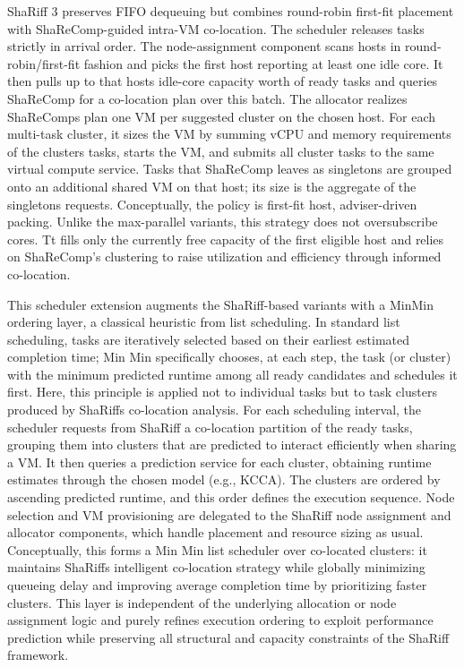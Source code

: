 ShaRiff 3 preserves FIFO dequeuing but combines round-robin first-fit placement with ShaReComp-guided intra-VM co-location. The scheduler releases tasks strictly in arrival order. The node-assignment component scans hosts in round-robin/first-fit fashion and picks the first host reporting at least one idle core. It then pulls up to that hosts idle-core capacity worth of ready tasks and queries ShaReComp for a co-location plan over this batch.
The allocator realizes ShaReComps plan one VM per suggested cluster on the chosen host. For each multi-task cluster, it sizes the VM by summing vCPU and memory requirements of the clusters tasks, starts the VM, and submits all cluster tasks to the same virtual compute service. Tasks that ShaReComp leaves as singletons are grouped onto an additional shared VM on that host; its size is the aggregate of the singletons requests.
Conceptually, the policy is first-fit host, adviser-driven packing. Unlike the max-parallel variants, this strategy does not oversubscribe cores. Tt fills only the currently free capacity of the first eligible host and relies on ShaReComp's clustering to raise utilization and efficiency through informed co-location.

This scheduler extension augments the ShaRiff-based variants with a MinMin ordering layer, a classical heuristic from list scheduling. In standard list scheduling, tasks are iteratively selected based on their earliest estimated completion time; Min Min specifically chooses, at each step, the task (or cluster) with the minimum predicted runtime among all ready candidates and schedules it first. Here, this principle is applied not to individual tasks but to task clusters produced by ShaRiffs co-location analysis.
For each scheduling interval, the scheduler requests from ShaRiff a co-location partition of the ready tasks, grouping them into clusters that are predicted to interact efficiently when sharing a VM. It then queries a prediction service for each cluster, obtaining runtime estimates through the chosen model (e.g., KCCA). The clusters are ordered by ascending predicted runtime, and this order defines the execution sequence. Node selection and VM provisioning are delegated to the ShaRiff node assignment and allocator components, which handle placement and resource sizing as usual.
Conceptually, this forms a Min Min list scheduler over co-located clusters: it maintains ShaRiffs intelligent co-location strategy while globally minimizing queueing delay and improving average completion time by prioritizing faster clusters. This layer is independent of the underlying allocation or node assignment logic and purely refines execution ordering to exploit performance prediction while preserving all structural and capacity constraints of the ShaRiff framework.